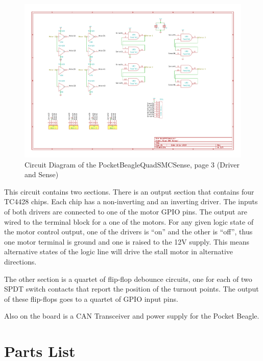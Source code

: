 \begin{figure}[hbpt]\begin{centering}%
\includegraphics[width=5in]{PocketBeagleQuadSMCSense-3.pdf}
\caption{Circuit Diagram of the PocketBeagleQuadSMCSense, page 3 (Driver and Sense)}
\end{centering}\end{figure}
This circuit contains two sections.  There is an output section that contains 
four TC4428 chips.  Each chip has a non-inverting and an inverting driver. The 
inputs of both drivers are connected to one of the motor GPIO pins.  The 
output are wired to the terminal block for a one of the motors. For any given 
logic state of the motor control output, one of the drivers is ``on'' and the 
other is ``off'', thus one motor terminal is ground and one is raised to the 
12V supply.  This means alternative states of the logic line will drive the 
stall motor in alternative directions.

The other section is a quartet of flip-flop debounce circuits, one for each
of two SPDT switch contacts that report the position of the turnout points.
The output of these flip-flops goes to a quartet of GPIO input pins.

Also on the board is a CAN Transceiver and power supply for the Pocket Beagle.

\section{Parts List}


